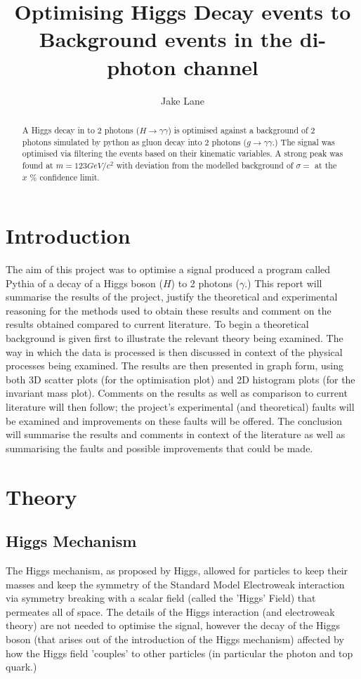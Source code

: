 \documentclass{article}
\author{Jake Lane}
\title{Optimising Higgs Decay events to Background events in the di-photon channel}
\begin{document}
\maketitle
\begin{abstract}
A Higgs decay in to 2 photons ($H \rightarrow \gamma \gamma$) is optimised against a background of 2 photons simulated by python as gluon decay into 2 photons ($g \rightarrow \gamma \gamma$.) The signal was optimised via filtering the events based on their kinematic variables. A strong peak was found at $m = 123 GeV/c^2$ with deviation from the modelled background of $\sigma = $ at the $x$ \% confidence limit.

\end{abstract}
\section{Introduction}
The aim of this project was to optimise a signal produced a program called Pythia of a decay of a Higgs boson ($H$) to 2 photons ($\gamma$.) This report will summarise the results of the project, justify the theoretical and experimental reasoning for the methods used to obtain these results and comment on the results obtained compared to current literature. \cite{HiggsDetection}
To begin a theoretical background is given first to illustrate the relevant theory being examined. The way in which the data is processed is then discussed in context of the physical processes being examined. The results are then presented in graph form, using both 3D scatter plots (for the optimisation plot) and 2D histogram plots (for the invariant mass plot). Comments on the results as well as comparison to current literature will then follow; the project's experimental (and theoretical) faults will be examined and improvements on these faults will be offered. The conclusion will summarise the results and comments in context of the literature as well as summarising the faults and possible improvements that could be made.  
\section{Theory}
\subsection{Higgs Mechanism}
The Higgs mechanism, as proposed by Higgs, allowed for particles to keep their masses and keep the symmetry of the Standard Model Electroweak interaction via symmetry breaking with a scalar field (called the 'Higgs' Field) that permeates all of space.\cite[p.~1159]{peterHiggs66} The details of the Higgs interaction (and electroweak theory) are not needed to optimise the signal, however the decay of the Higgs boson (that arises out of the introduction of the Higgs mechanism) affected by how the Higgs field 'couples' to other particles (in particular the photon and top quark.)
\end{document}
